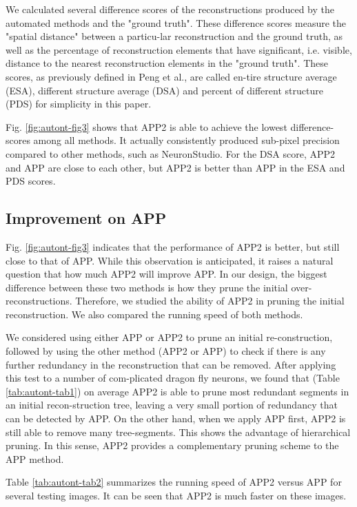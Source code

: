 We calculated several difference scores of the reconstructions produced by the automated methods and the "ground truth". These difference scores measure the "spatial distance" between a particu-lar reconstruction and the ground truth, as well as the percentage of reconstruction elements that have significant, i.e. visible, distance to the nearest reconstruction elements in the "ground truth". These scores, as previously defined in Peng et al.\cite{peng2010v3d}, are called en-tire structure average (ESA), different structure average (DSA) and percent of different structure (PDS) for simplicity in this paper. 

Fig. \ref{fig:autont-fig3} shows that APP2 is able to achieve the lowest difference-scores among all methods. It actually consistently produced sub-pixel precision compared to other methods, such as NeuronStudio. For the DSA score, APP2 and APP are close to each other, but APP2 is better than APP in the ESA and PDS scores. 

\subsection{Improvement on APP}
Fig. \ref{fig:autont-fig3} indicates that the performance of APP2 is better, but still close to that of APP. While this observation is anticipated, it raises a natural question that how much APP2 will improve APP. In our design, the biggest difference between these two methods is how they prune the initial over-reconstructions. Therefore, we studied the ability of APP2 in pruning the initial reconstruction. We also compared the running speed of both methods.

We considered using either APP or APP2 to prune an initial re-construction, followed by using the other method (APP2 or APP) to check if there is any further redundancy in the reconstruction that can be removed. After applying this test to a number of com-plicated dragon fly neurons, we found that (Table \ref{tab:autont-tab1}) on average APP2 is able to prune most redundant segments in an initial recon-struction tree, leaving a very small portion of redundancy that can be detected by APP. On the other hand, when we apply APP first, APP2 is still able to remove many tree-segments. This shows the advantage of hierarchical pruning. In this sense, APP2 provides a complementary pruning scheme to the APP method.  

Table \ref{tab:autont-tab2} summarizes the running speed of APP2 versus APP for several testing images. It can be seen that APP2 is much faster on these images.

